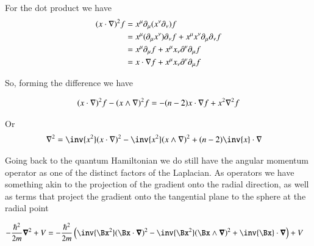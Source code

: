 For the dot product we have
\begin{align*}
(x \cdot \nabla)^2 f 
&=
x^\mu \partial_\mu( x^\nu \partial_\nu ) f \\
&=
x^\mu (\partial_\mu x^\nu) \partial_\nu  f + x^\mu x^\nu \partial_\mu \partial_\nu f \\
&=
x^\mu \partial_\mu f + x^\mu x_\nu \partial^\nu \partial_\mu f \\
&=
x \cdot \nabla f + x^\mu x_\nu \partial^\nu \partial_\mu f \\
\end{align*}

So, forming the difference we have

\begin{align*}
(x \cdot \nabla)^2 f - (x \wedge \nabla)^2 f &=
-(n - 2) x \cdot \nabla f + x^2 \nabla^2 f \\
\end{align*}

Or
\begin{align}
\grad^2 &= \inv{x^2} (x \cdot \grad)^2 - \inv{x^2} (x \wedge \grad)^2 + (n - 2) \inv{x} \cdot \grad 
\end{align}

Going back to the quantum Hamiltonian we do still have the angular momentum operator as one of the distinct factors of the Laplacian.  As operators we have something akin to the projection of the gradient onto the radial direction, as well as terms that project the gradient onto the tangential plane to the sphere at the radial point

\begin{align}
-\frac{\hbar^2}{2m} \spacegrad^2 + V
&=
-\frac{\hbar^2}{2m} \left( \inv{\Bx^2} (\Bx \cdot \spacegrad)^2 - \inv{\Bx^2} (\Bx \wedge \spacegrad)^2 + \inv{\Bx} \cdot \spacegrad \right) + V
\end{align}

\EndArticle
